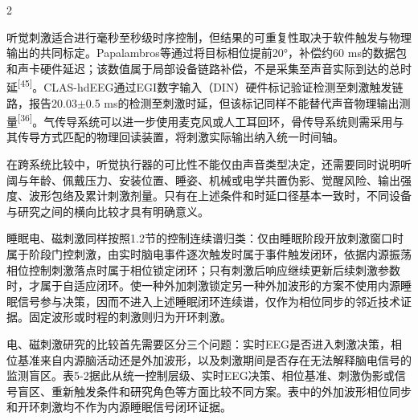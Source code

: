 \documentclass[UTF8,zihao=5,fontset=none]{ctexart}
\newcommand{\hei}{\CJKfamily{hei}}
\newcommand{\leveltwo}[1]{%
  \par\noindent{\hei\fontsize{10.5pt}{12.6pt}\selectfont\mdseries #1\par}}
\newcommand{\refcite}[1]{\nolinebreak[4]\textsuperscript{[#1]}}
\begin{document}
\begin{multicols}{2}

听觉刺激适合进行毫秒至秒级时序控制，但结果的可重复性取决于软件触发与物理输出的共同标定。Papalambros等通过将目标相位提前20°，补偿约60 ms的数据包和声卡硬件延迟；该数值属于局部设备链路补偿，不是采集至声音实际到达的总时延\refcite{45}。CLAS-hdEEG通过EGI数字输入（DIN）硬件标记验证检测至刺激触发链路，报告20.03$\pm$0.5 ms的检测至刺激时延，但该标记同样不能替代声音物理输出测量\refcite{36}。气传导系统可以进一步使用麦克风或人工耳回环，骨传导系统则需采用与其传导方式匹配的物理回读装置，将刺激实际输出纳入统一时间轴。\par

在跨系统比较中，听觉执行器的可比性不能仅由声音类型决定，还需要同时说明听阈与年龄、佩戴压力、安装位置、睡姿、机械或电学共置伪影、觉醒风险、输出强度、波形包络及累计刺激剂量。只有在上述条件和时延口径基本一致时，不同设备与研究之间的横向比较才具有明确意义。\par

\leveltwo{5.2 电刺激与磁刺激}

睡眠电、磁刺激同样按照1.2节的控制连续谱归类：仅由睡眠阶段开放刺激窗口时属于阶段门控刺激，由实时脑电事件逐次触发时属于事件触发闭环，依据内源振荡相位控制刺激落点时属于相位锁定闭环；只有刺激后响应继续更新后续刺激参数时，才属于自适应闭环。使一种外加刺激锁定另一种外加波形的方案不使用内源睡眠信号参与决策，因而不进入上述睡眠闭环连续谱，仅作为相位同步的邻近技术证据。固定波形或时程的刺激则归为开环刺激。\par

电、磁刺激研究的比较首先需要区分三个问题：实时EEG是否进入刺激决策，相位基准来自内源脑活动还是外加波形，以及刺激期间是否存在无法解释脑电信号的监测盲区。表5-2据此从统一控制层级、实时EEG决策、相位基准、刺激伪影或信号盲区、重新触发条件和研究角色等方面比较不同方案。表中的外加波形相位同步和开环刺激均不作为内源睡眠信号闭环证据。\par

\end{multicols}
\end{document}
